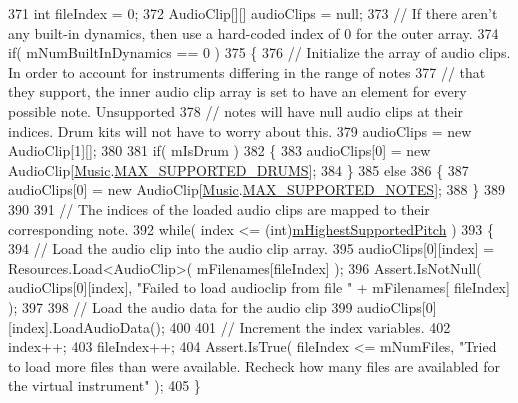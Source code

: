 \begin{DoxyCodeInclude}
371         \textcolor{keywordtype}{int} fileIndex = 0;
372         AudioClip[][] audioClips = null;
373         \textcolor{comment}{// If there aren't any built-in dynamics, then use a hard-coded index of 0 for the outer array.}
374         \textcolor{keywordflow}{if}( mNumBuiltInDynamics == 0 )
375         \{
376             \textcolor{comment}{// Initialize the array of audio clips. In order to account for instruments differing in the
       range of notes }
377             \textcolor{comment}{// that they support, the inner audio clip array is set to have an element for every possible
       note. Unsupported}
378             \textcolor{comment}{// notes will have null audio clips at their indices. Drum kits will not have to worry about
       this.   }
379             audioClips = \textcolor{keyword}{new} AudioClip[1][];
380 
381             \textcolor{keywordflow}{if}( mIsDrum )
382             \{
383                 audioClips[0] = \textcolor{keyword}{new} AudioClip[\hyperlink{class_music}{Music}.\hyperlink{group___music_constants_gabce1a1ac5b9b6355af6bd7fb3868467a}{MAX\_SUPPORTED\_DRUMS}];
384             \}
385             \textcolor{keywordflow}{else}
386             \{
387                 audioClips[0] = \textcolor{keyword}{new} AudioClip[\hyperlink{class_music}{Music}.\hyperlink{group___music_constants_gaaf07da909a12e9fec0e43b70864f27b7}{MAX\_SUPPORTED\_NOTES}];
388             \}
389 
390 
391             \textcolor{comment}{// The indices of the loaded audio clips are mapped to their corresponding note. }
392             \textcolor{keywordflow}{while}( index <= (\textcolor{keywordtype}{int})\hyperlink{group___v_i_base_pro_var_ga61fb2c33b53a0f663047779d7ceb18f3}{mHighestSupportedPitch} )
393             \{
394                 \textcolor{comment}{// Load the audio clip into the audio clip array.}
395                 audioClips[0][index] = Resources.Load<AudioClip>( mFilenames[fileIndex] );
396                 Assert.IsNotNull( audioClips[0][index], \textcolor{stringliteral}{"Failed to load audioclip from file "} + mFilenames[
      fileIndex] );
397 
398                 \textcolor{comment}{// Load the audio data for the audio clip}
399                 audioClips[0][index].LoadAudioData();
400 
401                 \textcolor{comment}{// Increment the index variables.}
402                 index++;
403                 fileIndex++;
404                 Assert.IsTrue( fileIndex <= mNumFiles, \textcolor{stringliteral}{"Tried to load more files than were available.
       Recheck how many files are availabled for the virtual instrument"} );
405             \}

\end{DoxyCodeInclude}
